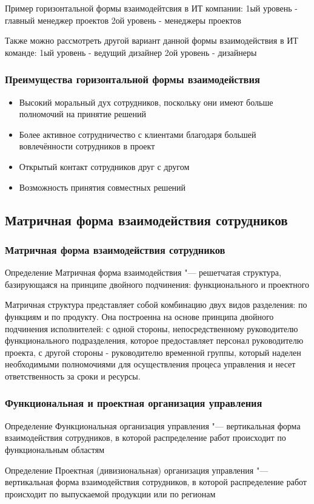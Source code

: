 \documentclass{../industrial-development}
\begin{document}
\lecturenotes
Пример горизонтальной формы взаимодейтсвия в ИТ компании:
1ый уровень - главный менеджер проектов
2ой уровень - менеджеры проектов

Также можно рассмотреть другой вариант данной формы взаимодействия в ИТ команде:
1ый уровень -  ведущий дизайнер
2ой уровень - дизайнеры

\begin{frame} \frametitle{Преимущества горизонтальной формы взаимодействия}
  
  \begin{itemize}
  \item Высокий моральный дух сотрудников, поскольку они имеют больше полномочий на принятие решений
  \item Более активное сотрудничество с клиентами благодаря большей вовлечённости сотрудников в проект
  \item Открытый контакт сотрудников друг с другом
  \item Возможность принятия совместных решений
  \end{itemize}
\end{frame}

\subsection{Матричная форма взаимодействия сотрудников}

\begin{frame} \frametitle{Матричная форма взаимодействия сотрудников}
  \begin{block}{Определение}
	\alert{Матричная форма взаимодействия} "--- решетчатая структура, базирующаяся на принципе  двойного подчинения: функционального и проектного
  \end{block}
\end{frame}

\lecturenotes
Матричная структура представляет собой комбинацию двух видов разделения: по функциям и по продукту. Она построенна на основе принципа двойного подчинения исполнителей: с одной стороны, непосредственному руководителю функционального подразделения, которое предоставляет персонал руководителю проекта, с другой стороны  - руководителю временной группы, который наделен необходимыми полномочиями для осуществления процеса управления и несет ответственность за сроки и ресурсы.

\begin{frame} \frametitle{Функциональная и проектная организация управления}
	\begin{block}{Определение}
		\alert{Функциональная организация управления} "--- вертикальная форма взаимодействия сотрудников, в которой распределение работ происходит по функциональным областям
	\end{block}
	\begin{block}{Определение}
		\alert{Проектная (дивизиональная) организация управления} "--- вертикальная форма взаимодействия сотрудников, в которой распределение работ происходит по выпускаемой продукции или по регионам
	\end{block}
\end{frame}
\end{document}
